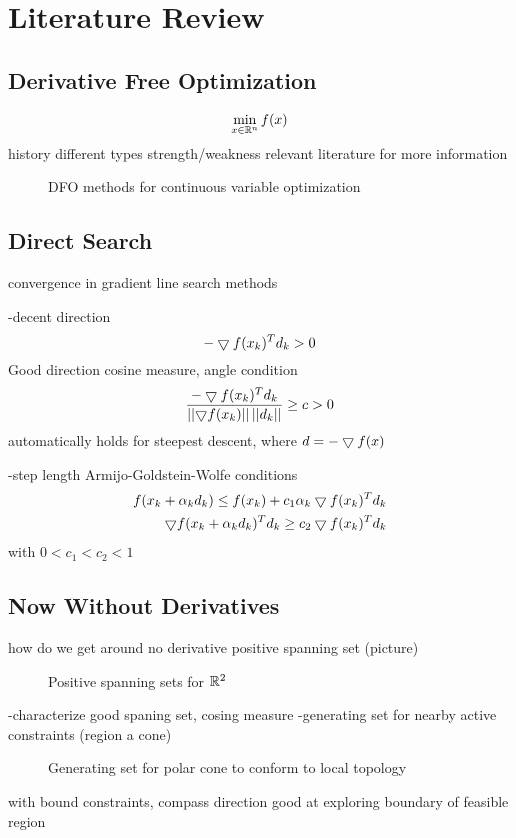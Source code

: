 \section{Literature Review}

\subsection{Derivative Free Optimization}


\begin{equation}
\min_{x \in \mathbb{R}^{n}} f(x)
\end{equation}
history
different types
strength/weakness
relevant literature for more information

\begin{figure}
\centering

\caption{DFO methods for continuous variable optimization}
\end{figure}

\subsection{Direct Search}
convergence in gradient line search methods

-decent direction
\begin{equation}
-\bigtriangledown f(x_k)^T d_k > 0
\end{equation}
Good direction cosine measure, angle condition
\begin{equation}
\frac{-\bigtriangledown f(x_k)^T d_k}{\left| \left| {\bigtriangledown f(x_k) } \right| \right| \left| \left| {d_k} \right| \right|} \geq c > 0
\end{equation}
automatically holds for steepest descent, where $d=-\bigtriangledown f(x)$

-step length Armijo-Goldstein-Wolfe conditions
\begin{align}
f(x_k + \alpha_k d_k) \le f(x_k) + c_1 \alpha_k \bigtriangledown f(x_k)^T d_k  \label{step_length_1}\\
\bigtriangledown f (x_k + \alpha_k d_k)^T d_k \ge c_2 \bigtriangledown f(x_k)^T d_k \label{step_length_2}
\end{align}
with $0 < c_1 < c_2 < 1$


\subsection*{Now Without Derivatives}
how do we get around no derivative
positive spanning set (picture)
\begin{figure}
\centering

\caption{Positive spanning sets for $\mathbb{R}^{2}$}
\end{figure}
-characterize good spaning set, cosing measure
-generating set for nearby active constraints (region a cone)
\begin{figure}
\centering

\caption{Generating set for polar cone to conform to local topology}
\end{figure}
with bound constraints, compass direction good at exploring boundary of feasible region


